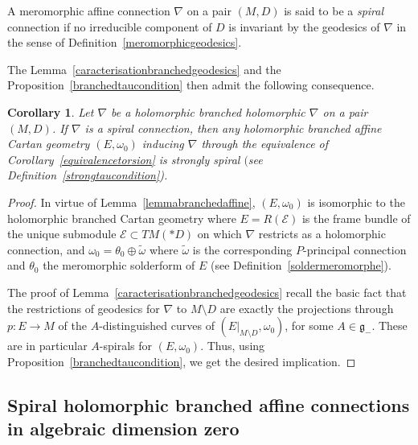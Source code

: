 \documentclass[10pt,a4paper]{amsart}
\numberwithin{equation}{section}
\newtheorem{Corollary}[Theorem]{Corollary}
\begin{document}
\begin{Definition}\label{tauconnection} A meromorphic affine connection $\nabla$ on a pair $(M,D)$ is said to be a \textit{spiral} connection if no irreducible component of $D$ is invariant by the geodesics of $\nabla$ in the sense of Definition~\ref{meromorphicgeodesics}. \end{Definition}

The Lemma~\ref{caracterisationbranchedgeodesics} and the Proposition~\ref{branchedtaucondition} then admit the following consequence.

\begin{Corollary}\label{tauconnectionstaucondition} Let $\nabla$ be a holomorphic branched holomorphic $\nabla$ on a pair $(M,D)$. If $\nabla$ is a spiral connection, then any holomorphic branched affine Cartan geometry $(E,\omega_0)$ inducing $\nabla$ through the equivalence of Corollary~{\rm \ref{equivalencetorsion}} is strongly spiral $($see Definition~{\rm \ref{strongtaucondition})}. \end{Corollary}
\begin{proof} In virtue of Lemma~\ref{lemmabranchedaffine}, $(E,\omega_0)$ is isomorphic to the holomorphic branched Cartan geometry where $E=R(\mathcal{E})$ is the frame bundle of the unique submodule $\mathcal{E}\subset TM(* D)$ on which $\nabla$ restricts as a holomorphic connection, and $\omega_0=\theta_0 \oplus \tilde{\omega}$ where $\tilde{\omega}$ is the corresponding $P$-principal connection and $\theta_0$ the meromorphic solderform of $E$ (see Definition~\ref{soldermeromorphe}).

The proof of Lemma~\ref{caracterisationbranchedgeodesics} recall the basic fact that the restrictions of geodesics for $\nabla$ to $M\setminus D$ are exactly the projections through $p\colon E\longrightarrow M$ of the $A$-distinguished curves of $(E|_{M\setminus D},\omega_0)$, for some $A\in \mathfrak{g}_-$. These are in particular $A$-spirals for $(E,\omega_0)$. Thus, using Proposition~\ref{branchedtaucondition}, we get the desired implication. \end{proof}

\subsection[Spiral holomorphic branched affine connections in algebraic dimension zero]{Spiral holomorphic branched affine connections \\ in algebraic dimension zero}
\end{document}
